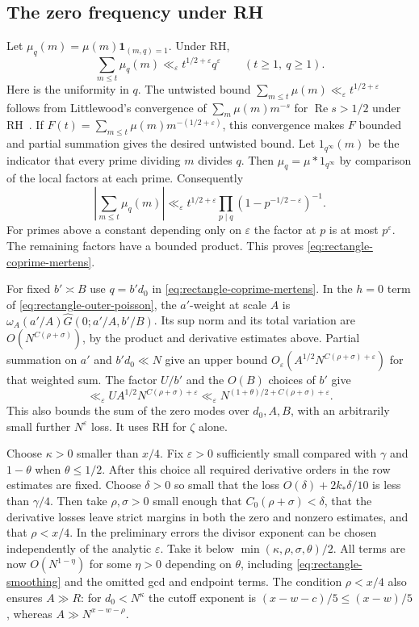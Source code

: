 \documentclass[11pt]{amsart}
\numberwithin{equation}{section}
\theoremstyle{remark}
\begin{document}
\subsection{The zero frequency under RH}

Let \(\mu_q(m)=\mu(m)\mathbf 1_{(m,q)=1}\). Under RH,
\begin{equation}\label{eq:rectangle-coprime-mertens}
  \sum_{m\le t}\mu_q(m)
  \ll_\varepsilon t^{1/2+\varepsilon}q^\varepsilon
  \qquad(t\ge1,\ q\ge1).
\end{equation}
Here is the uniformity in \(q\). The untwisted bound
\(\sum_{m\le t}\mu(m)\ll_\varepsilon t^{1/2+\varepsilon}\)
follows from Littlewood's convergence of
\(\sum_m\mu(m)m^{-s}\) for \(\operatorname{Re}s>1/2\) under
RH~\cite{littlewood1912}. If
\(F(t)=\sum_{m\le t}\mu(m)m^{-(1/2+\varepsilon)}\), this convergence
makes \(F\) bounded and partial summation gives the desired untwisted
bound. Let \(1_{q^\infty}(m)\) be the indicator that every prime
dividing \(m\) divides \(q\). Then \(\mu_q=\mu*1_{q^\infty}\)
by comparison of the local factors at each prime. Consequently
\[
 \left|\sum_{m\le t}\mu_q(m)\right|
 \ll_\varepsilon t^{1/2+\varepsilon}
      \prod_{p\mid q}(1-p^{-1/2-\varepsilon})^{-1}.
\]
For primes above a constant depending only on \(\varepsilon\) the
factor at \(p\) is at most \(p^\varepsilon\). The remaining factors
have a bounded product. This proves \eqref{eq:rectangle-coprime-mertens}.

For fixed \(b'\asymp B\) use \(q=b'd_0\) in
\eqref{eq:rectangle-coprime-mertens}. In the \(h=0\) term of
\eqref{eq:rectangle-outer-poisson}, the \(a'\)-weight at scale
\(A\) is \(\omega_A(a'/A)\widehat G(0;a'/A,b'/B)\).
Its sup norm and its total variation are
\(O(N^{C(\rho+\sigma)})\), by the product and derivative estimates
above. Partial summation on \(a'\) and \(b'd_0\ll N\) give
an upper bound \(O_\varepsilon(A^{1/2}N^{C(\rho+\sigma)+\varepsilon})\)
for that weighted sum. The factor \(U/b'\) and the \(O(B)\) choices
of \(b'\) give
\[
 \ll_\varepsilon U A^{1/2} N^{C(\rho+\sigma)+\varepsilon}
 \ll_\varepsilon
 N^{(1+\theta)/2+C(\rho+\sigma)+\varepsilon}.
\]
This also bounds the sum of the zero modes over \(d_0,A,B\), with
an arbitrarily small further \(N^\varepsilon\) loss. It uses RH
for \(\zeta\) alone.

Choose \(\kappa>0\) smaller than \(x/4\).
Fix \(\varepsilon>0\) sufficiently small compared with \(\gamma\)
and \(1-\theta\) when \(\theta\le1/2\).
After this choice all required derivative orders in the row
estimates are fixed. Choose \(\delta>0\) so small that the
loss \(O(\delta)+2k_*\delta/10\) is less than \(\gamma/4\).
Then take \(\rho,\sigma>0\) small enough that
\(C_0(\rho+\sigma)<\delta\), that the derivative losses leave
strict margins in both the zero and nonzero estimates, and that
\(\rho<x/4\). In the preliminary errors the divisor exponent can be
chosen independently of the analytic \(\varepsilon\). Take it below
\(\min(\kappa,\rho,\sigma,\theta)/2\).
All terms are now \(O(N^{1-\eta})\) for some \(\eta>0\) depending on
\(\theta\), including \eqref{eq:rectangle-smoothing} and the omitted
gcd and endpoint terms. The condition \(\rho<x/4\) also ensures
\(A\gg R\): for \(d_0<N^\kappa\) the cutoff exponent is
\((x-w-c)/5\le (x-w)/5\), whereas
\(A\gg N^{x-w-\rho}\).
\end{document}
